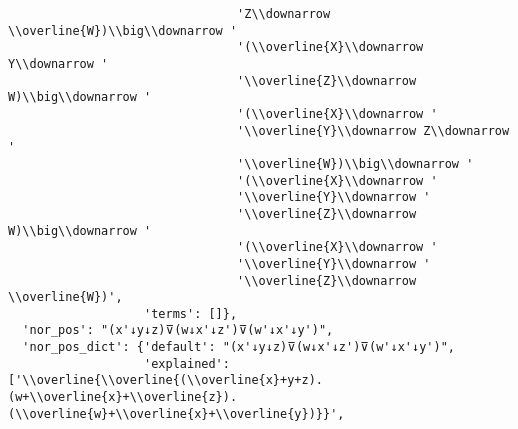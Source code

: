 \begin{verbatim}
                                'Z\\downarrow \\overline{W})\\big\\downarrow '
                                '(\\overline{X}\\downarrow Y\\downarrow '
                                '\\overline{Z}\\downarrow W)\\big\\downarrow '
                                '(\\overline{X}\\downarrow '
                                '\\overline{Y}\\downarrow Z\\downarrow '
                                '\\overline{W})\\big\\downarrow '
                                '(\\overline{X}\\downarrow '
                                '\\overline{Y}\\downarrow '
                                '\\overline{Z}\\downarrow W)\\big\\downarrow '
                                '(\\overline{X}\\downarrow '
                                '\\overline{Y}\\downarrow '
                                '\\overline{Z}\\downarrow \\overline{W})',
                   'terms': []},
  'nor_pos': "(x'↓y↓z)⊽(w↓x'↓z')⊽(w'↓x'↓y')",
  'nor_pos_dict': {'default': "(x'↓y↓z)⊽(w↓x'↓z')⊽(w'↓x'↓y')",
                   'explained': ['\\overline{\\overline{(\\overline{x}+y+z).(w+\\overline{x}+\\overline{z}).(\\overline{w}+\\overline{x}+\\overline{y})}}',

\end{verbatim}
